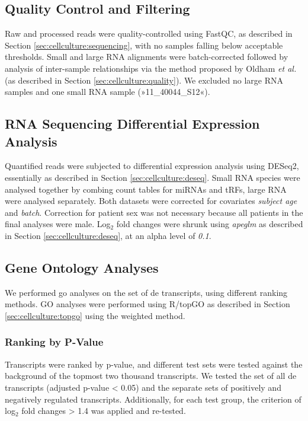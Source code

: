 \begin{method}
\subsection{Quality Control and Filtering}
Raw and processed reads were quality-controlled using FastQC, as described in Section \ref{sec:cellculture:sequencing}, with no samples falling below acceptable thresholds. Small and large RNA alignments were batch-corrected followed by analysis of inter-sample relationships via the method proposed by Oldham \emph{et al.}\cite{Oldham2012} (as described in Section \ref{sec:cellculture:quality}). We excluded no large RNA samples and one small RNA sample (»11\_40044\_S12«).

\subsection{RNA Sequencing Differential Expression Analysis}
Quantified reads were subjected to differential expression analysis using DESeq2, essentially as described in Section \ref{sec:cellculture:deseq}. Small RNA species were analysed together by combing count tables for miRNAs and tRFs, large RNA were analysed separately. Both datasets were corrected for covariates \emph{subject age} and \emph{batch}. Correction for patient sex was not necessary because all patients in the final analyses were male. Log$_2$ fold changes were shrunk using \emph{apeglm} as described in Section \ref{sec:cellculture:deseq}, at an alpha level of \emph{0.1}.

\subsection{Gene Ontology Analyses}
We performed \ac{go} analyses on the set of \ac{de} transcripts, using different ranking methods. GO analyses were performed using R/topGO as described in Section \ref{sec:cellculture:topgo} using the weighted method.

\subsubsection{Ranking by P-Value}
Transcripts were ranked by p-value, and different test sets were tested against the background of the topmost two thousand transcripts. We tested the set of all \ac{de} transcripts (adjusted p-value < 0.05) and the separate sets of positively and negatively regulated transcripts. Additionally, for each test group, the criterion of log$_2$ fold changes > 1.4 was applied and re-tested.


\end{method}
